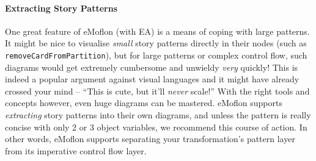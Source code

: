 \paragraph{Extracting Story Patterns} 
One great feature of eMoflon (with EA) is a means of coping with large patterns. It might be nice to visualise \emph{small} story patterns directly in their
nodes (such as \texttt{removeCardFromPartition}), but for large patterns or complex control flow, such diagrams would get extremely cumbersome and unwieldy
\emph{very} quickly! This is indeed a popular argument against visual languages and it might have already crossed your mind -- ``This is cute, but it'll
\emph{never} scale!'' With the right tools and concepts however, even huge diagrams can be mastered. eMoflon supports \emph{extracting} story patterns into
their own diagrams, and unless the pattern is really concise with only 2 or 3 object variables, we recommend this course of action. In other words, eMoflon
supports separating your transformation's pattern layer from its imperative control flow layer.


